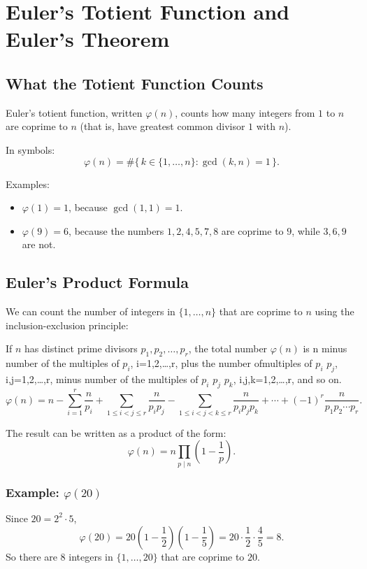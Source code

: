 \chapter{Euler's Totient Function and Euler's Theorem}

\section{What the Totient Function Counts}
Euler's totient function, written \(\varphi(n)\), counts how many integers from
\(1\) to \(n\) are coprime to \(n\) (that is, have greatest common divisor \(1\)
with \(n\)).\cite{wiki:euler-totient}

In symbols:
\[
  \varphi(n)=\#\{\,k \in \{1,\dots,n\} : \gcd(k,n)=1\,\}.
\]

Examples:
\begin{itemize}
  \item \(\varphi(1)=1\), because \(\gcd(1,1)=1\).
  \item \(\varphi(9)=6\), because the numbers
        \(1,2,4,5,7,8\) are coprime to \(9\), while \(3,6,9\) are not.
\end{itemize}


\section{Euler's Product Formula}
We can count the number of integers in \(\{1,\dots,n\}\) that are coprime to \(n\)
using the inclusion-exclusion principle: 

If \(n\) has distinct prime divisors \(p_1, p_2, \dots, p_r\),
the total number \(\varphi(n)\) is n minus number of the multiples of \(p_i\), i=1,2,\dots,r,
plus the number ofmultiples of \(p_i\) \(p_j\), i,j=1,2,\dots,r, minus number of the multiples of 
\(p_i\) \(p_j\) \(p_k\), i,j,k=1,2,\dots,r, and so on.
\[
  \varphi(n)
  = n
  - \sum_{i=1}^{r}\frac{n}{p_i}
  + \sum_{1\le i<j\le r}\frac{n}{p_i p_j}
  - \sum_{1\le i<j<k\le r}\frac{n}{p_i p_j p_k}
  + \cdots
  + (-1)^r\frac{n}{p_1p_2\cdots p_r}.
\]

The result can be written as a product of the form:
\[
  \varphi(n)=n\prod_{p\mid n}\left(1-\frac{1}{p}\right).
\]

\subsection*{Example: \texorpdfstring{\(\varphi(20)\)}{phi(20)}}
Since \(20=2^2\cdot 5\),
\[
  \varphi(20)=20\left(1-\frac12\right)\left(1-\frac15\right)
  =20\cdot \frac12\cdot \frac45=8.
\]
So there are 8 integers in \(\{1,\dots,20\}\) that are coprime to \(20\).

